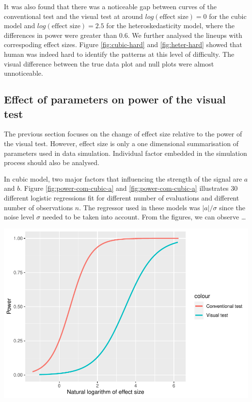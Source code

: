 \documentclass[]{interact}
\theoremstyle{plain}%
\theoremstyle{definition}
\theoremstyle{remark}
\begin{document}
It was also found that there was a noticeable gap between curves of the
conventional test and the visual test at around
\(log(\text{effect size}) = 0\) for the cubic model and
\(log(\text{effect size}) = 2.5\) for the heteroskedasticity model,
where the differences in power were greater than 0.6. We further
analysed the lineups with correspoding effect sizes. Figure
\ref{fig:cubic-hard} and \ref{fig:heter-hard} showed that human was
indeed hard to identify the patterns at this level of difficulty. The
visual difference between the true data plot and null plots were almost
unnoticeable.

\hypertarget{effect-of-parameters-on-power-of-the-visual-test}{%
\subsection{Effect of parameters on power of the visual
test}\label{effect-of-parameters-on-power-of-the-visual-test}}

The previous section focuses on the change of effect size relative to
the power of the visual test. However, effect size is only a one
dimensional summarisation of parameters used in data simulation.
Individual factor embedded in the simulation process should also be
analysed.

In cubic model, two major factors that influencing the strength of the
signal are \(a\) and \(b\). Figure \ref{fig:power-com-cubic-a} and
\ref{fig:power-com-cubic-a} illustrates 30 different logistic
regressions fit for different number of evaluations and different number
of observations \(n\). The regressor used in these models was
\(|a|/\sigma\) since the noise level \(\sigma\) needed to be taken into
account. From the figures, we can observe \ldots{}

\includegraphics{paper_comparison_files/figure-latex/power-vs-log-effect-size-1.pdf}
\end{document}

